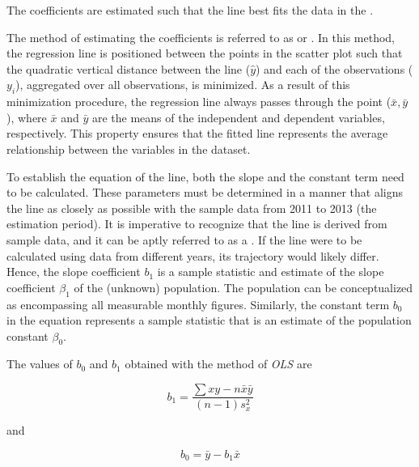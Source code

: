 The coefficients are estimated such that the line best fits the data in the . 

The method of estimating the coefficients is referred to as  or . 
In this method, the regression line is positioned between the points in the scatter plot such that the quadratic vertical distance between the line ($\hat{y}$) and each of the observations ($y_i$), aggregated over all observations, is minimized. 
As a result of this minimization procedure, the regression line always passes through the point ($\bar{x}, \bar{y}$), where $\bar{x}$ and $\bar{y}$ are the means of the independent and dependent variables, respectively. 
This property ensures that the fitted line represents the average relationship between the variables in the dataset.

To establish the equation of the line, both the slope and the constant term need to be calculated. 
These parameters must be determined in a manner that aligns the line as closely as possible with the sample data from 2011 to 2013 (the estimation period). It is imperative to recognize that the line is derived from sample data, and it can be aptly referred to as a . 
If the line were to be calculated using data from different years, its trajectory would likely differ. 
Hence, the slope coefficient $b_1$ is a sample statistic and estimate of the slope coefficient $\beta_1$ of the (unknown) population. 
The population can be conceptualized as encompassing all measurable monthly figures. 
Similarly, the constant term $b_0$ in the equation represents a sample statistic that is an estimate of the population constant $\beta_0$. 

\bigskip
The values of $b_0$ and $b_1$ obtained with the method of \emph{OLS} are

\begin{equation}
b_1 = \frac{\sum{xy} - n \bar{x} \bar{y}}{(n - 1) s^2_x}
\label{eq:slope_coefficient}
\end{equation}

\noindent and

\begin{equation}
b_0 = \bar{y} - b_1 \bar{x}
\label{eq:intercept_coefficient}
\end{equation}

